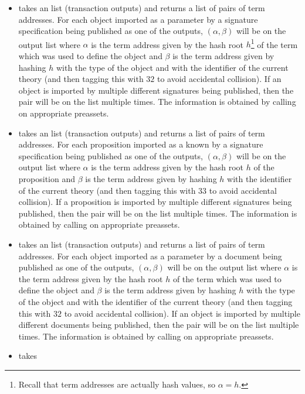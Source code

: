 \begin{itemize}
\item {} takes
an {} list (transaction outputs)
and returns a list of pairs of term addresses.
For each object imported as a parameter by a signature specification being published as one of the outputs,
$(\alpha,\beta)$ will be on the output list
where $\alpha$ is the term address given by the hash root $h$\footnote{Recall that term addresses are actually hash values, so $\alpha = h$.}
of the term which was used to define the object
and $\beta$ is the term address given by hashing $h$ with the type of the object and with the identifier of the current theory
(and then tagging this with $32$ to avoid accidental collision).
If an object is imported by multiple
different signatures being published, then the pair will be on the list multiple times.
The information is obtained by calling {} on appropriate preassets.
\item {} takes
an {} list (transaction outputs)
and returns a list of pairs of term addresses.
For each proposition imported as a known by a signature specification being published as one of the outputs,
$(\alpha,\beta)$ will be on the output list
where $\alpha$ is the term address given by the hash root $h$
of the proposition
and $\beta$ is the term address given by hashing $h$ with the identifier of the current theory
(and then tagging this with $33$ to avoid accidental collision).
If a proposition is imported by multiple
different signatures being published, then the pair will be on the list multiple times.
The information is obtained by calling {} on appropriate preassets.
\item {} takes
an {} list (transaction outputs)
and returns a list of pairs of term addresses.
For each object imported as a parameter by a document being published as one of the outputs,
$(\alpha,\beta)$ will be on the output list
where $\alpha$ is the term address given by the hash root $h$
of the term which was used to define the object
and $\beta$ is the term address given by hashing $h$ with the type of the object and with the identifier of the current theory
(and then tagging this with $32$ to avoid accidental collision).
If an object is imported by multiple
different documents being published, then the pair will be on the list multiple times.
The information is obtained by calling {} on appropriate preassets.
\item {} takes

\end{itemize}
